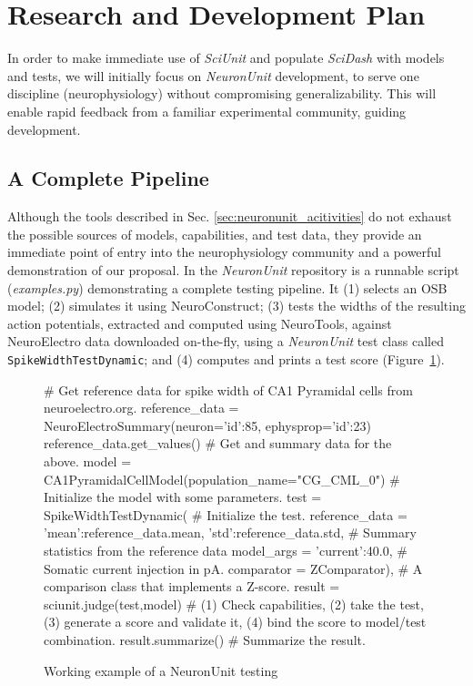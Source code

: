 \documentclass[11pt,letterpaper]{article}
\let\verbx\lstinline
\begin{document}

\section{Research and Development Plan}
In order to make immediate use of \textit{SciUnit} and populate \textit{SciDash} with models and tests, we will initially focus on \textit{NeuronUnit} development, to serve one discipline (neurophysiology) without compromising generalizability. This will enable rapid feedback from a familiar experimental community, guiding development.  

\subsection{A Complete Pipeline}
Although the tools described in Sec. \ref{sec:neuronunit_acitivities} do not exhaust the possible sources of models, capabilities, and test data, they provide an immediate point of entry into the neurophysiology community and a powerful demonstration of our proposal.  In the \textit{NeuronUnit} repository\cite{neurounit_url} is a runnable script (\textit{examples.py}) demonstrating a complete testing pipeline.  It (1) selects an OSB model; (2) simulates it using NeuroConstruct; (3) tests the widths of the resulting action potentials, extracted and computed using NeuroTools, against NeuroElectro data downloaded on-the-fly, using a \textit{NeuronUnit} test class called \verbx{SpikeWidthTestDynamic}; and (4) computes and prints a test score (Figure~\ref{fig:neuronunit_example}).

\begin{figure}
\begin{python}
# Get reference data for spike width of CA1 Pyramidal cells from neuroelectro.org. 
reference_data = NeuroElectroSummary(neuron={'id':85}, ephysprop={'id':23})
reference_data.get_values()  # Get and summary data for the above. 
model = CA1PyramidalCellModel(population_name="CG_CML_0") # Initialize the model with some parameters.
test = SpikeWidthTestDynamic( # Initialize the test.    
	reference_data = {'mean':reference_data.mean, 'std':reference_data.std}, # Summary statistics from the reference data
	model_args = {'current':40.0}, # Somatic current injection in pA.  
	comparator = ZComparator), # A comparison class that implements a Z-score.  
result = sciunit.judge(test,model) # (1) Check capabilities, (2) take the test, (3) generate a score and validate it, (4) bind the score to model/test combination. 
result.summarize() # Summarize the result.  
\end{python}
\caption{Working example of a NeuronUnit testing}
\label{fig:neuronunit_example}
\vspace{-15px}
\end{figure}
\end{document}
